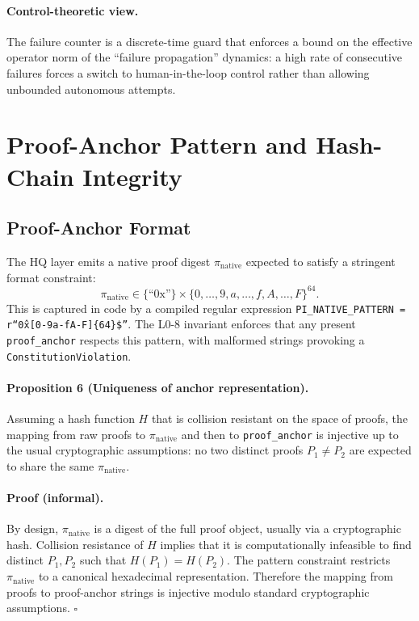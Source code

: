 \documentclass[11pt]{article}
\begin{document}
\paragraph{Control-theoretic view.}
The failure counter is a discrete-time guard that enforces a bound on the effective operator norm of the ``failure propagation'' dynamics: a high rate of consecutive failures forces a switch to human-in-the-loop control rather than allowing unbounded autonomous attempts.

\section{Proof-Anchor Pattern and Hash-Chain Integrity}

\subsection{Proof-Anchor Format}

The HQ layer emits a native proof digest \(\pi_{\mathrm{native}}\) expected to satisfy a stringent format constraint:
\[
  \pi_{\mathrm{native}} \in \{ \text{``0x''} \}\times\{0,\dots,9,a,\dots,f,A,\dots,F\}^{64}.
\]
This is captured in code by a compiled regular expression \texttt{PI\_NATIVE\_PATTERN = r``\^0x[0-9a-fA-F]\{64\}\$''}.\cite{cite:41}
The L0-8 invariant enforces that any present \texttt{proof\_anchor} respects this pattern, with malformed strings provoking a \texttt{ConstitutionViolation}.\cite{cite:41,cite:43}

\paragraph{Proposition 6 (Uniqueness of anchor representation).}
Assuming a hash function \(H\) that is collision resistant on the space of proofs, the mapping from raw proofs to \(\pi_{\mathrm{native}}\) and then to \texttt{proof\_anchor} is injective up to the usual cryptographic assumptions: no two distinct proofs \(P_1\neq P_2\) are expected to share the same \(\pi_{\mathrm{native}}\).

\paragraph{Proof (informal).}
By design, \(\pi_{\mathrm{native}}\) is a digest of the full proof object, usually via a cryptographic hash. Collision resistance of \(H\) implies that it is computationally infeasible to find distinct \(P_1,P_2\) such that \(H(P_1)=H(P_2)\). The pattern constraint restricts \(\pi_{\mathrm{native}}\) to a canonical hexadecimal representation. Therefore the mapping from proofs to proof-anchor strings is injective modulo standard cryptographic assumptions. \(\square\)
\end{document}
